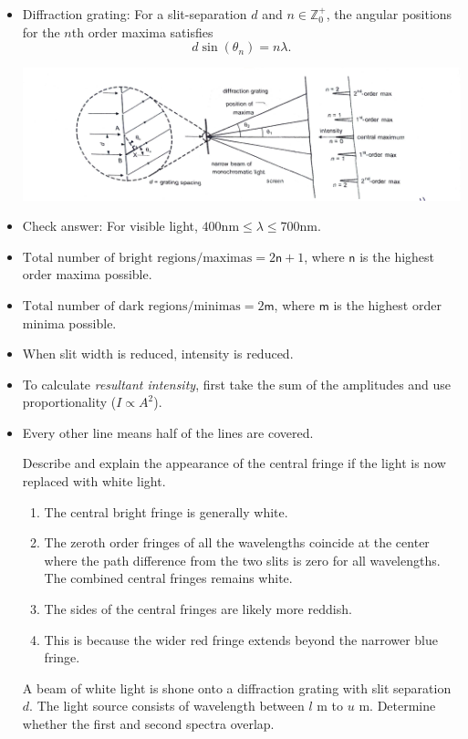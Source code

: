 \documentclass[oneside]{book}
\begin{document}
\begin{itemize}
\begin{figure}[H]
        \label{fig:combined-single-double-diffraction}
    \end{figure}
    \item Diffraction grating: For a slit-separation \(d\) and \(n \in \mathbb{Z}^{+}_{0}\), the angular positions for the \(n\)th order maxima satisfies
    \[d \sin(\theta_n)=n\lambda.\]
    \begin{center}
        \includegraphics[scale=0.1]{../images/Diffraction Grating.jpg}
        \captionsetup{type=figure}
    \end{center}
    \item Check answer: For visible light, \(400\text{nm} \leq \lambda \leq 700\text{nm}\).
    \item \(\text{Total number of bright regions/maximas}=2\mathsf{n}+1\), where \(\mathsf{n}\) is the highest order maxima possible.
    \item \(\text{Total number of dark regions/minimas}=2\mathsf{m}\), where \(\mathsf{m}\) is the highest order minima possible.
    \item When slit width is reduced, intensity is reduced.
    \item To calculate \emph{resultant intensity}, first take the sum of the amplitudes and use proportionality (\(I \propto A^2\)).  
    \item Every other line means half of the lines are covered.
    \begin{example}{}{}
        Describe and explain the appearance of the central fringe if the light is now replaced with white light.
    \begin{enumerate}
        \item The central bright fringe is generally white.
        \item The zeroth order fringes of all the wavelengths coincide at the center where the path difference from the two slits is zero for all wavelengths. The combined central fringes remains white.
        \item The sides of the central fringes are likely more reddish.
        \item  This is because the wider red fringe extends beyond the narrower blue fringe.
    \end{enumerate}
    \end{example}
    \begin{example}{}{}
        A beam of white light is shone onto a diffraction grating with slit separation \(d\). The light source consists of wavelength between \(l\) m to \(u\) m. Determine whether the first and second spectra overlap.


\end{example}
\end{itemize}
\end{document}

